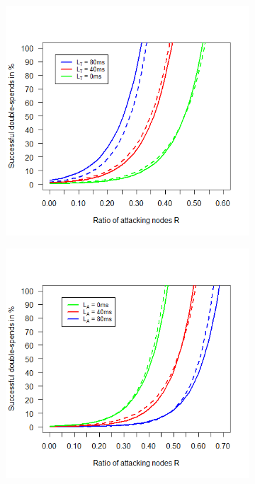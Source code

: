 \documentclass[a4paper,12pt,twoside]{report}
\begin{document}
\begin{figure}
\begin{subfigure}{.495\textwidth}
  \centering
  \includegraphics[width=\linewidth]{Comparison/TruLatency/trurat.png}
\end{subfigure}
\begin{subfigure}{.495\textwidth}
  \centering
  \includegraphics[width=\linewidth]{Comparison/AttLatency/attrat.png}

\end{subfigure}
\end{figure}
\end{document}
